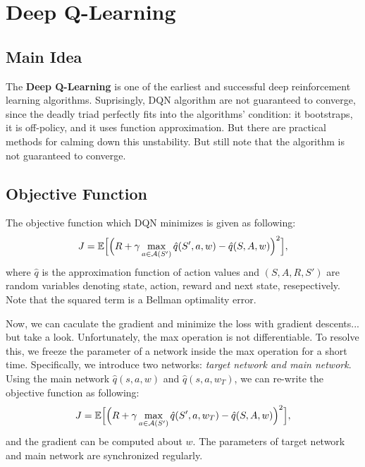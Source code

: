 \section{Deep Q-Learning}
    \subsection{Main Idea}
        The \textbf{Deep Q-Learning} \cite{Mnih2013} is one of the earliest and successful deep reinforcement learning algorithms.
        Suprisingly, DQN algorithm are not guaranteed to converge, since the deadly triad perfectly fits into the algorithms' condition:
        it bootstraps, it is off-policy, and it uses function approximation. But there are practical methods for calming down this unstability.
        But still note that the algorithm is not guaranteed to converge.

    \subsection{Objective Function}
        The objective function which DQN minimizes is given as following:
        \begin{equation}
            J = \mathbb{E}\Big[\Big( R + \gamma \max_{a \in \mathcal{A}(S')}{\hat{q}(S',a,w)} - \hat{q}(S, A, w) \Big)^2\Big],
        \end{equation}
        where $\hat{q}$ is the approximation function of action values
        and $(S, A, R, S')$ are random variables denoting state, action, reward and next state, resepectively.
        Note that the squared term is a Bellman optimality error.

        Now, we can caculate the gradient and minimize the loss with gradient descents... but take a look. Unfortunately, the
        max operation is not differentiable. To resolve this, we freeze the parameter of a network inside the max operation for a short time. Specifically,
        we introduce two networks: \emph{target network and main network}. Using the main network $\hat{q}(s, a, w)$ and $\hat{q}(s, a, w_T)$,
        we can re-write the objective function as following:
        \begin{equation}
            J = \mathbb{E}\Big[\Big( R + \gamma \max_{a \in \mathcal{A}(S')}{\hat{q}(S',a,w_T)} - \hat{q}(S, A, w) \Big)^2\Big], \label{eq:DQNObjective}
        \end{equation}
        and the gradient can be computed about $w$. The parameters of target network and main network are synchronized regularly.

